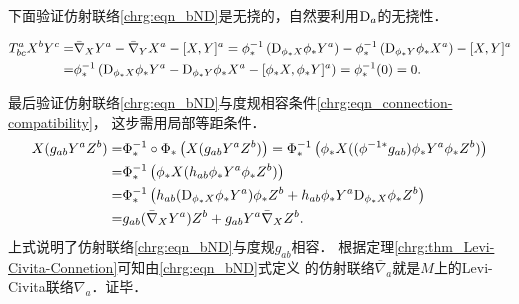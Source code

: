 下面验证仿射联络\eqref{chrg:eqn_bND}是无挠的，自然要利用${\rm D}_a$的无挠性．
\begin{small}
\begin{align*}
	T^a_{bc} X^b Y^c = & \bar{\nabla}_X Y^a - \bar{\nabla}_Y X^a -[X,Y]^a 
	=  \phi^{-1}_* \left( {\rm D}_{\phi_* X} \phi_*Y^a \right) 
	-\phi^{-1}_* \left( {\rm D}_{\phi_* Y} \phi_*X^a \right) -[X,Y]^a \\
	=&\phi^{-1}_* \left( {\rm D}_{\phi_* X} \phi_*Y^a 
	-  {\rm D}_{\phi_* Y} \phi_*X^a -[\phi_*X,\phi_*Y]^a \right) 
	=\phi^{-1}_*(0) = 0.
\end{align*} %
\end{small}
最后验证仿射联络\eqref{chrg:eqn_bND}与度规相容条件\eqref{chrg:eqn_connection-compatibility}，
这步需用局部等距条件．
\begin{align*}
	X(g_{ab} Y^a Z^b) = & \Phi^{-1}_*\circ \Phi_* \left(X(g_{ab} Y^a Z^b) \right)
	=\Phi^{-1}_*  \left(\phi_* X( (\phi^{-1*}g_{ab}) \phi_*Y^a \phi_*Z^b) \right) \\
	=& \Phi^{-1}_*  \left(\phi_* X(h_{ab} \phi_*Y^a \phi_*Z^b) \right)\\
	=& \Phi^{-1}_*  \left(h_{ab} ({\rm D}_{\phi_* X} \phi_*Y^a) \phi_*Z^b
	 + h_{ab} \phi_*Y^a {\rm D}_{\phi_* X}\phi_*Z^b\right) \\
	=&g_{ab} (\bar{\nabla}_{X} Y^a) Z^b + g_{ab} Y^a \bar{\nabla}_{X} Z^b .
\end{align*}
上式说明了仿射联络\eqref{chrg:eqn_bND}与度规$g_{ab}$相容．
根据定理\ref{chrg:thm_Levi-Civita-Connetion}可知由\eqref{chrg:eqn_bND}式定义
的仿射联络$\bar{\nabla}_a$就是$M$上的Levi-Civita联络${\nabla}_a$．证毕．


